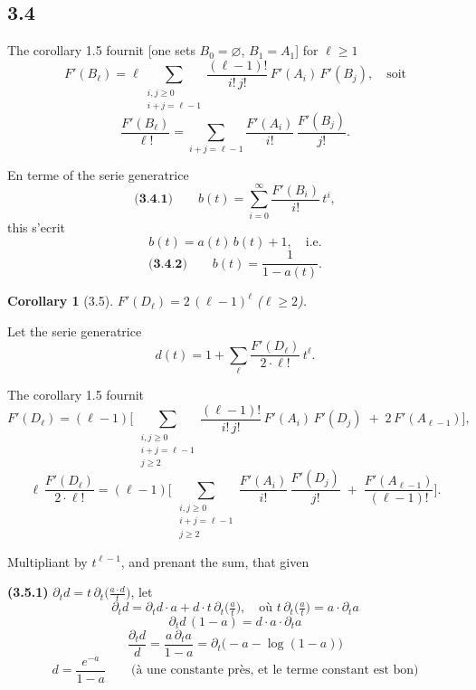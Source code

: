 \documentclass[11pt,a4paper]{article}
\theoremstyle{plain}
\newtheorem{corollary}[theorem]{Corollary}
\theoremstyle{definition}
\begin{document}
\subsection*{3.4}

The corollary 1.5 fournit [one sets $B_0 = \varnothing$, $B_1 = A_1$] for $\ell \geq 1$
\[
F'(B_\ell) = \ell \sum_{\substack{i,j \geq 0 \\ i+j=\ell-1}} \frac{(\ell-1)!}{i!\, j!}\, F'(A_i)\, F'(B_j), \quad \text{soit}
\]
\[
\frac{F'(B_\ell)}{\ell!} = \sum_{i+j=\ell-1} \frac{F'(A_i)}{i!}\, \frac{F'(B_j)}{j!}.
\]

En terme of the serie generatrice
\[
\textbf{(3.4.1)} \qquad b(t) = \sum_{i=0}^{\infty} \frac{F'(B_i)}{i!}\, t^i,
\]
this s'ecrit
\[
b(t) = a(t)\, b(t) + 1, \quad \text{i.e.}
\]
\[
\textbf{(3.4.2)} \qquad b(t) = \frac{1}{1 - a(t)}.
\]

\newpage

\begin{corollary}[3.5]
$F'(D_\ell) = 2\, (\ell-1)^\ell$ \qquad ($\ell \geq 2$).
\end{corollary}

Let the serie generatrice
\[
d(t) = 1 + \sum_\ell \frac{F'(D_\ell)}{2 \cdot \ell!}\, t^\ell.
\]

The corollary 1.5 fournit
\[
F'(D_\ell) = (\ell-1) \Biggl[\, \sum_{\substack{i,j \geq 0 \\ i+j=\ell-1 \\ j \geq 2}} \frac{(\ell-1)!}{i!\, j!}\, F'(A_i)\, F'(D_j) \;+\; 2\, F'(A_{\ell-1}) \Biggr],
\]
\[
\ell \, \frac{F'(D_\ell)}{2 \cdot \ell!} = (\ell-1) \Biggl[\, \sum_{\substack{i,j \geq 0 \\ i+j=\ell-1 \\ j \geq 2}} \frac{F'(A_i)}{i!}\, \frac{F'(D_j)}{j!} \;+\; \frac{F'(A_{\ell-1})}{(\ell-1)!} \Biggr].
\]

Multipliant by $t^{\ell-1}$, and prenant the sum, that given

\smallskip

\noindent
\textbf{(3.5.1)} $\partial_t d = t\, \partial_t\bigl(\tfrac{a \cdot d}{t}\bigr)$, \quad let
\[
\partial_t d = \partial_t d \cdot a + d \cdot t\, \partial_t\bigl(\tfrac{a}{t}\bigr), \quad \text{o\`u } t\, \partial_t\bigl(\tfrac{a}{t}\bigr) = a \cdot \partial_t a
\]
\[
\partial_t d\, (1-a) = d \cdot a \cdot \partial_t a
\]
\[
\frac{\partial_t d}{d} = \frac{a\, \partial_t a}{1-a} = \partial_t \bigl(-a - \log(1-a)\bigr)
\]
\[
d = \frac{e^{-a}}{1-a} \qquad \text{(\`a une constante pr\`es, et le terme constant est bon)}
\]
\end{document}
